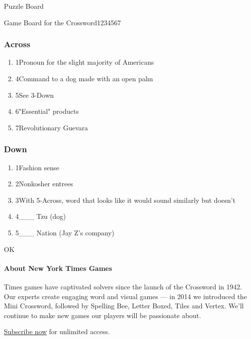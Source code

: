 Puzzle Board

Game Board for the Crossword1234567

\hypertarget{across}{%
\subsubsection{Across}\label{across}}

\begin{enumerate}
\def\labelenumi{\arabic{enumi}.}
\tightlist
\item
  1Pronoun for the slight majority of Americans
\item
  4Command to a dog made with an open palm
\item
  5See 3-Down
\item
  6"Essential" products
\item
  7Revolutionary Guevara
\end{enumerate}

\hypertarget{down}{%
\subsubsection{Down}\label{down}}

\begin{enumerate}
\def\labelenumi{\arabic{enumi}.}
\tightlist
\item
  1Fashion sense
\item
  2Nonkosher entrees
\item
  3With 5-Across, word that looks like it would sound similarly but
  doesn't
\item
  4\_\_\_ Tzu (dog)
\item
  5\_\_\_ Nation (Jay Z's company)
\end{enumerate}

OK

\hypertarget{about-new-york-times-games}{%
\paragraph{About New York Times
Games}\label{about-new-york-times-games}}

Times games have captivated solvers since the launch of the Crossword in
1942. Our experts create engaging word and visual games --- in 2014 we
introduced the Mini Crossword, followed by Spelling Bee, Letter Boxed,
Tiles and Vertex. We'll continue to make new games our players will be
passionate about.

\href{https://www.nytimes.com/subscription/games?campaignId=9W9LL}{Subscribe
now} for unlimited access.


